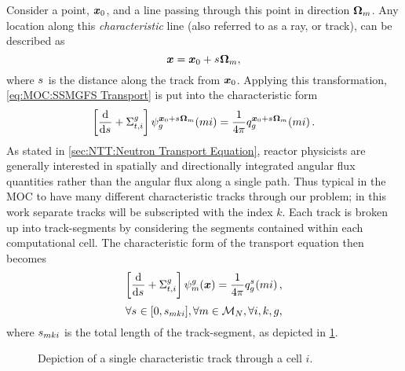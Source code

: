 {{        Consider a point, $\boldsymbol{x}_0$, and a line passing through this point in direction $\dirm$.
        Any location along this \emph{characteristic} line (also referred to as a ray, or track), can be described as
        \begin{equation}\label{eq:MOC:Characteristic Ray}
            \loc = \loc_0 + \len\dirm,
        \end{equation}
        where $\len$ is the distance along the track from $\boldsymbol{x}_0$.
        Applying this transformation, \cref{eq:MOC:SSMGFS Transport} is put into the characteristic form
        \begin{equation}\label{eq:MOC:Characteristic Form Deriv 1}
            \left[\deriv{}{\len} + \xst\right]\aflux[mi][g][\loc_0 + \len\dirm] = \rfourpi\source[mi][g][\loc_0 + \len\dirm].
        \end{equation}
        As stated in \cref{sec:NTT:Neutron Transport Equation}, reactor physicists are generally interested in spatially and directionally integrated angular flux quantities rather than the angular flux along a single path.
        Thus typical in the \ac{MOC} to have many different characteristic tracks through our problem; in this work separate tracks will be subscripted with the index $k$.
        Each track is broken up into track-segments by considering the segments contained within each computational cell.
        The characteristic form of the transport equation then becomes
        \begin{equation}\label{eq:MOC:MOC Equation Generic}
            \left[\deriv{}{\len} + \xst\right]\aflux = \rfourpi\source[mi][g][\len],
        \end{equation}
        \begin{equation*}
            \forall \len \in [0,\segl], \forall m\in\angquad, \forall i,k,g,
        \end{equation*}
        where $\segl$ is the total length of the track-segment, as depicted in \cref{fig:MOC:MOC Coordinate System}.

        \begin{figure}[h]
            \centering
            \def\svgwidth{0.4\linewidth}
            
            \caption{Depiction of a single characteristic track through a cell $i$.}
            \label{fig:MOC:MOC Coordinate System}
        \end{figure}

}}
